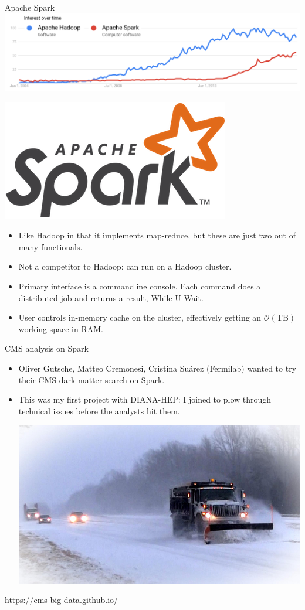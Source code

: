 \documentclass{beamer}
\begin{document}
\begin{frame}{Apache Spark}
\vspace{0.5 cm}
\includegraphics[width=\linewidth]{hadoop-versus-spark.png}

\vfill
\includegraphics[width=0.25\linewidth]{spark.png}

\begin{itemize}
\item Like Hadoop in that it implements map-reduce, but these are just two out of many functionals.
\item<2-> Not a competitor to Hadoop: can run on a Hadoop cluster.
\item<3-> Primary interface is a commandline console. Each command does a distributed job and returns a result, While-U-Wait\texttrademark.
\item<4-> User controls in-memory cache on the cluster, effectively getting an $\mathcal{O}(\mbox{TB})$ working space in RAM.
\end{itemize}
\end{frame}

\begin{frame}{CMS analysis on Spark}
\vspace{0.5 cm}
\begin{itemize}
\item Oliver Gutsche, Matteo Cremonesi, Cristina Su\'arez (Fermilab) wanted to try their CMS dark matter search on Spark.
\item This was my first project with DIANA-HEP: I joined to plow through technical issues before the analysts hit them.

\vfill
\begin{center}
\includegraphics[width=0.75\linewidth]{snowplow.jpg}
\end{center}
\end{itemize}
\begin{center}
\textcolor{blue}{\underline{\url{https://cms-big-data.github.io/}}}
\end{center}
\end{frame}
\end{document}
